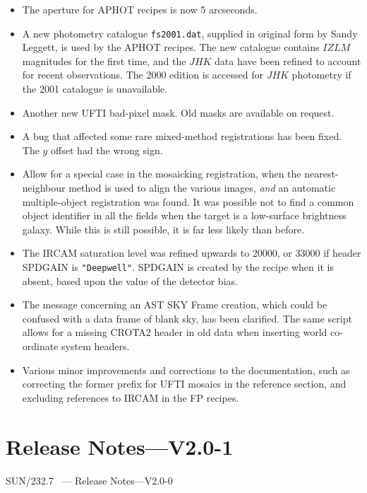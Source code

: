 \documentclass[twoside,11pt]{article}
\newcommand{\stardocinitials}  {SUN}
\newcommand{\stardocnumber}    {232.7}
\newcommand{\stardocname}{\stardocinitials /\stardocnumber}
\newcommand{\xlabel}[1]{}
\renewcommand{\_}{\texttt{\symbol{95}}}
\begin{document}
\begin{itemize}
   \item The aperture for \_APHOT recipes is now 5 arcseconds.
   \item A new photometry catalogue {\tt fs2001.dat}, supplied in
      original form by Sandy Leggett, is used by the \_APHOT recipes.
      The new catalogue contains $IZLM$ magnitudes for the first time,
      and the $JHK$ data have been refined to account for recent
      observations.  The 2000 edition is accessed for $JHK$ photometry
      if the 2001 catalogue is unavailable. 
   \item Another new UFTI bad-pixel mask.  Old masks are available on
      request.
   \item A bug that affected some rare mixed-method registrations has
      been fixed.  The $y$ offset had the wrong sign.
   \item Allow for a special case in the mosaicking registration, when
      the nearest-neighbour method is used to align the various images,
      {\em{and}} an automatic multiple-object registration was found.
      It was possible not to find a common object identifier in all
      the fields when the target is a low-surface brightness galaxy.
      While this is still possible, it is far less likely than before.
   \item The IRCAM saturation level was refined upwards to 20000, or
      33000 if header SPD\_GAIN is {\tt{"Deepwell"}}.  SPD\_GAIN
      is created by the recipe when it is absent, based upon the value
      of the detector bias.
   \item The message concerning an AST SKY Frame creation,
      which could be confused with a data frame of blank sky, has been
      clarified.  The same script allows for a missing CROTA2 header
      in old data when inserting world co-ordinate system headers.
   \item Various minor improvements and corrections to the
      documentation, such as correcting the former prefix for UFTI
      mosaics in the reference section, and excluding references to
      IRCAM in the FP recipes.
\end{itemize}


\section{\xlabel{se_changes2p0}Release Notes---V2.0-1\label{se_changes2p0}}
\markboth{{\stardocname}~ --- Release Notes---V2.0-0}
{{\stardocname}~ --- Release Notes---V2.0-0}
\end{document}
